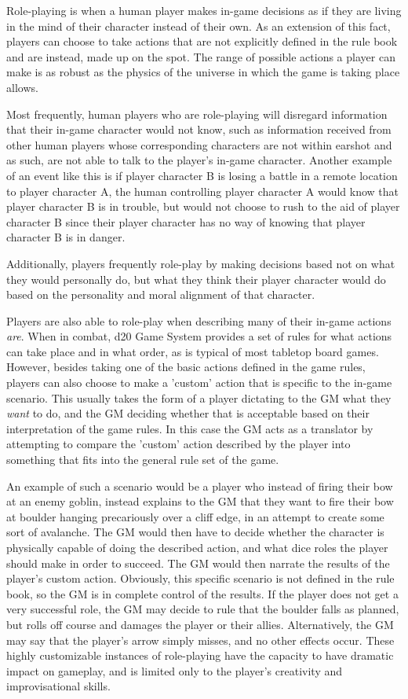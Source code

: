 \documentclass[12pt,a4paper]{report}
\begin{document}
		Role-playing is when a human player makes in-game decisions as if they are living in the mind of their character instead of their own. As an extension of this fact, players can choose to take actions that are not explicitly defined in the rule book and are instead, made up on the spot. The range of possible actions a player can make is as robust as the physics of the universe in which the game is taking place allows. 
		
		Most frequently, human players who are role-playing will disregard information that their in-game character would not know, such as information received from other human players whose corresponding characters are not within earshot and as such, are not able to talk to the player's in-game character. Another example of an event like this is if player character B is losing a battle in a remote location to player character A, the human controlling player character A would know that player character B is in trouble, but would not choose to rush to the aid of player character B since their player character has no way of knowing that player character B is in danger. 
		
		Additionally, players frequently role-play by making decisions based not on what they would personally do, but what they think their player character would do based on the personality and moral alignment of that character.
		
		Players are also able to role-play when describing many of their in-game actions \textit{are}. When in combat, d20 Game System provides a set of rules for what actions can take place and in what order, as is typical of most tabletop board games. However, besides taking one of the basic actions defined in the game rules, players can also choose to make a 'custom' action that is specific to the in-game scenario. This usually takes the form of a player dictating to the GM what they \textit{want} to do, and the GM deciding whether that is acceptable based on their interpretation of the game rules. In this case the GM acts as a translator by attempting to compare the 'custom' action described by the player into something that fits into the general rule set of the game. 
		
		An example of such a scenario would be a player who instead of firing their bow at an enemy goblin, instead explains to the GM that they want to fire their bow at boulder hanging precariously over a cliff edge, in an attempt to create some sort of avalanche. The GM would then have to decide whether the character is physically capable of doing the described action, and what dice roles the player should make in order to succeed. The GM would then narrate the results of the player's custom action. Obviously, this specific scenario is not defined in the rule book, so the GM is in complete control of the results. If the player does not get a very successful role, the GM may decide to rule that the boulder falls as planned, but rolls off course and damages the player or their allies. Alternatively, the GM may say that the player's arrow simply misses, and no other effects occur. These highly customizable instances of role-playing have the capacity to have dramatic impact on gameplay, and is limited only to the player's creativity and improvisational skills. 
		
\end{document}
